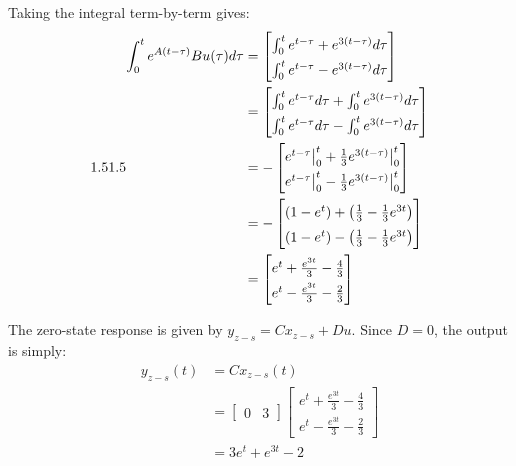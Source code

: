 Taking the integral term-by-term gives:
\[
    \arraystretch{1.5}
    \begin{aligned}
    \int_{0}^{t} e^{A(t-\tau)}Bu(\tau) d\tau &=
    \begin{bmatrix}
        \int_{0}^{t} e^{t-\tau} + e^{3(t-\tau)} d\tau \\
        \int_{0}^{t} e^{t-\tau} - e^{3(t-\tau)} d\tau
    \end{bmatrix} \\
    &=
    \begin{bmatrix}
        \int_{0}^{t} e^{t-\tau} d\tau + \int_{0}^{t} e^{3(t-\tau)} d\tau \\
        \int_{0}^{t} e^{t-\tau} d\tau - \int_{0}^{t} e^{3(t-\tau)} d\tau
    \end{bmatrix} \\
    &=
    -
    \begin{bmatrix}
        e^{t-\tau} \big|_{0}^{t} + \frac{1}{3}e^{3(t-\tau)} \big|_{0}^{t} \\
        e^{t-\tau} \big|_{0}^{t} - \frac{1}{3}e^{3(t-\tau)} \big|_{0}^{t}
    \end{bmatrix} \\
    &=
    -
    \begin{bmatrix}
        (1 - e^{t}) + \left(\frac{1}{3} - \frac{1}{3}e^{3t}\right) \\
        (1 - e^{t}) - \left(\frac{1}{3} - \frac{1}{3}e^{3t}\right)
    \end{bmatrix} \\
    &=
    \begin{bmatrix}
        e^{t} + \frac{e^{3t}}{3} - \frac{4}{3} \\
        e^{t} - \frac{e^{3t}}{3} - \frac{2}{3}
    \end{bmatrix}
\end{aligned}
\]

The zero-state response is given by $y_{z-s} = Cx_{z-s} + Du$. Since $D = 0$, the output is simply:
\[
\begin{aligned}
    y_{z-s}(t) &= Cx_{z-s}(t) \\
    &=
    \begin{bmatrix}
        0 & 3
    \end{bmatrix}
    \begin{bmatrix}
        e^{t} + \frac{e^{3t}}{3} - \frac{4}{3} \\
        e^{t} - \frac{e^{3t}}{3} - \frac{2}{3}
    \end{bmatrix} \\
    &= 3e^{t} + e^{3t} - 2
\end{aligned}
\]

